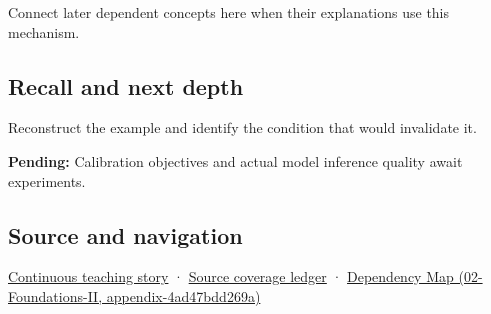 Connect later dependent concepts here when their explanations use this mechanism.

\subsection{Recall and next depth}\label{appendix-d5da3eaabaef-recall-and-next-depth}

Reconstruct the example and identify the condition that would invalidate it.

\textbf{Pending:} Calibration objectives and actual model inference quality await experiments.

\subsection{Source and navigation}\label{appendix-d5da3eaabaef-source-and-navigation}

\hyperref[01-foundations-i-ch001-choosing-what-information-to-keep]{Continuous teaching story} · \hyperref[appendix-fd090d982a15]{Source coverage ledger} · \href{../02-Foundations-II/main.pdf\#nameddest=appendix-4ad47bdd269a}{Dependency Map (02-Foundations-II, appendix-4ad47bdd269a)}
